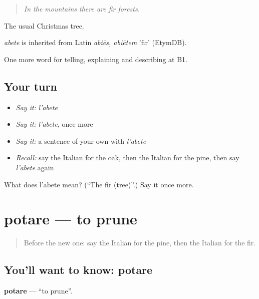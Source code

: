 \begin{quote}
\emph{In the mountains there are fir forests.}
\end{quote}

The usual Christmas tree.

\begin{cousinweb}
\emph{abete} is inherited from Latin \emph{abiēs, abiētem} 'fir' (EtymDB).
\end{cousinweb}

\begin{grammarlens}[title={What you've built}]
One more word for telling, explaining and describing at B1.
\end{grammarlens}

\subsection*{Your turn}
\begin{itemize}
\raggedright
  \item \emph{Say it:} \emph{l'abete}
  \item \emph{Say it:} \emph{l'abete}, once more
  \item \emph{Say it:} a sentence of your own with \emph{l'abete}
  \item \emph{Recall:} say the Italian for the oak, then the Italian for the pine, then say \emph{l'abete} again
\end{itemize}

\begin{tcolorbox}[breakable,colback=teal!4,colframe=teal!35!black,title={Before you move on}]
What does l'abete mean? (\textquotedblleft{}The fir (tree)\textquotedblright{}.) Say it once more.
\end{tcolorbox}
\section[potare]{potare — to prune}

\label{lesson:IT-C461-potare}



\begin{quote}
Before the new one: say the Italian for the pine, then the Italian for the fir.
\end{quote}

\subsection*{You'll want to know: potare}
\textbf{potare} — \textquotedblleft{}to prune\textquotedblright{}.

